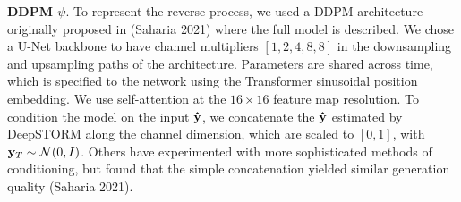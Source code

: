 \documentclass{article}
\begin{document}
\textbf{DDPM $\psi$}. To represent the reverse process, we used a DDPM architecture originally proposed in (Saharia 2021) where the full model is described. We chose a U-Net backbone to have channel multipliers $[1,2,4,8,8]$ in the downsampling and upsampling paths of the architecture. Parameters are shared across time, which is specified to the network using the Transformer sinusoidal position embedding. We use self-attention at the $16 \times 16$ feature map resolution. To condition the model on the input $\bold{\hat{y}}$, we concatenate the $\bold{\hat{y}}$ estimated by DeepSTORM along the channel dimension, which are scaled to $[0,1]$, with $\bold{y}_T\sim \mathcal{N}(0, I)$. Others have experimented with more sophisticated methods of conditioning, but found that the simple concatenation yielded similar generation quality (Saharia 2021). 
\end{document}
